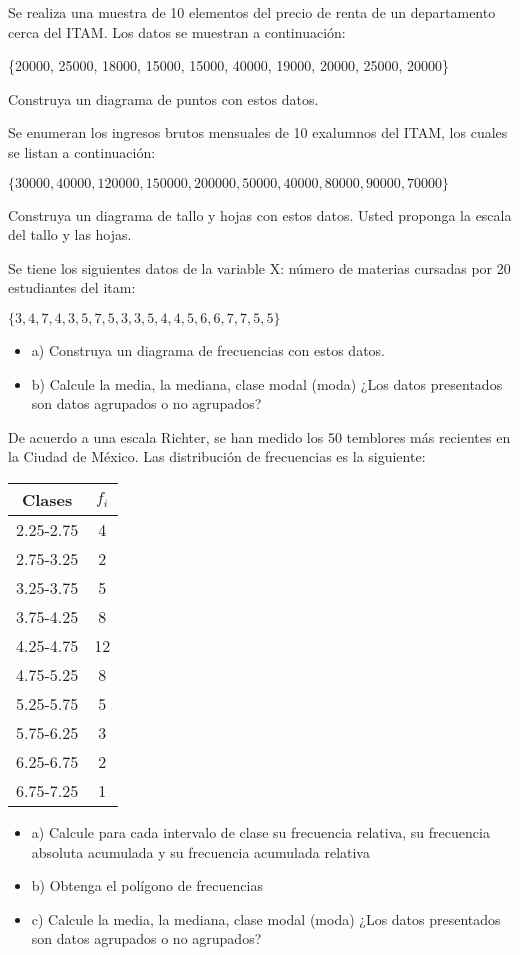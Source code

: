\documentclass{oxmathproblems}
\begin{document}
\begin{questions}

\miquestion Se realiza una muestra de 10 elementos del precio de renta de un departamento cerca del ITAM. Los datos se muestran a continuación:

\{20000, 25000, 18000, 15000, 15000, 40000, 19000, 20000, 25000, 20000\}

Construya un diagrama de puntos con estos datos.

\miquestion Se enumeran los ingresos brutos mensuales de 10 exalumnos del ITAM, los cuales se listan a continuación:

$\{30000, 40000, 120000, 150000, 200000, 50000, 40000, 80000, 90000, 70000\}$

Construya un diagrama de tallo y hojas con estos datos. Usted proponga la escala del tallo y las hojas.

\miquestion Se tiene los siguientes datos de la variable X: número de materias cursadas por 20 estudiantes del itam:

$\{3,4,7,4,3,5,7,5,3,3,5,4,4,5,6,6,7,7,5,5\}$

\begin{itemize}
\item a) Construya un diagrama de frecuencias con estos datos.
\item b) Calcule la media, la mediana, clase modal (moda) ¿Los datos presentados son datos agrupados o no agrupados?
\end{itemize}

\miquestion De acuerdo a una escala Richter, se han medido los 50 temblores más recientes en la Ciudad de México. Las distribución de frecuencias es la siguiente:
\begin{center}
\begin{tabular}{ |c|c| } 
 \hline
 \textbf{Clases} & \textbf{$f_i$} \\ 
 \hline
 2.25-2.75 & 4 \\
 2.75-3.25 & 2 \\
 3.25-3.75 & 5\\ 
 3.75-4.25 & 8 \\ 
 4.25-4.75 & 12 \\ 
 4.75-5.25 & 8 \\ 
 5.25-5.75 & 5 \\ 
 5.75-6.25 & 3 \\ 
 6.25-6.75 & 2 \\ 
 6.75-7.25 & 1 \\ 
 \hline
\end{tabular}
\end{center}

\begin{itemize}
\item a) Calcule para cada intervalo de clase su frecuencia relativa, su frecuencia absoluta acumulada y su frecuencia acumulada relativa
\item b) Obtenga el polígono de frecuencias
\item c) Calcule la media, la mediana, clase modal (moda) ¿Los datos presentados son datos agrupados o no agrupados?
\end{itemize}

\end{questions}
\end{document}
